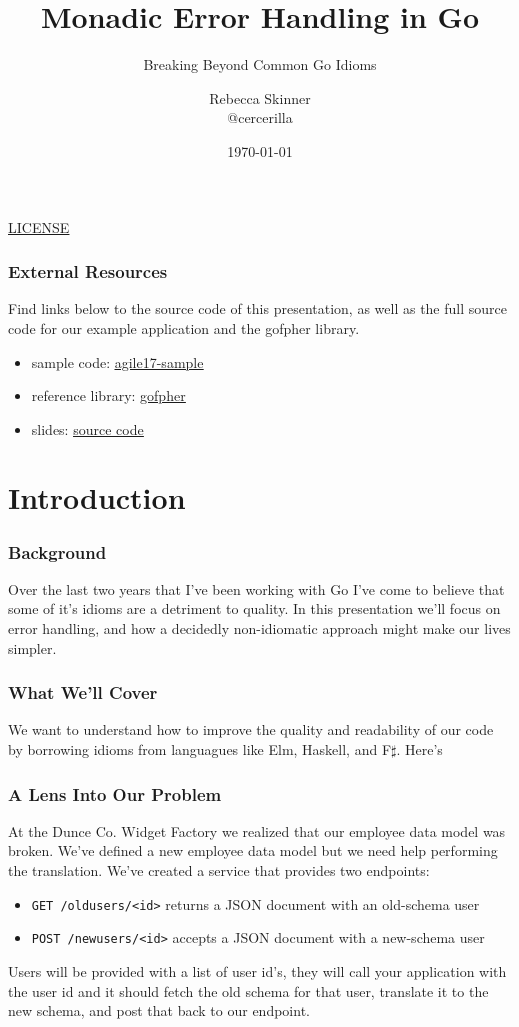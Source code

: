 \documentclass{beamer}
\title{Monadic Error Handling in Go}
\subtitle{Breaking Beyond Common Go Idioms}
\author{Rebecca Skinner\\ \small{@cercerilla}}
\institute{Asteris, LLC}
\date{\today}
\newcommand{\chref}[3] {
  {\color{#1} \href{#2}{\underline{#3}}}
}
\begin{document}
\begin{frame}
  \titlepage{}
  \begin{center}
    \small{\chref{blue}{http://creativecommons.org/licenses/by-sa/4.0/}{LICENSE}}
  \end{center}
\end{frame}

\begin{frame}
  \frametitle{External Resources}
  Find links below to the source code of this presentation, as well as
  the full source code for our example application and the gofpher
  library.
  \\\vfill
  \begin{itemize}
  \item sample code: \chref{blue}{https://github.com/rebeccaskinner/agile17-sample}{agile17-sample}
  \item reference library: \chref{blue}{https://github.com/rebeccaskinner/gofpher}{gofpher}
  \item slides: \chref{blue}{https://github.com/rebeccaskinner/presentations/tree/agile-tech-2017/agile_tech_conference_2017}{source code}
  \end{itemize}
\end{frame}

\section{Introduction}
\begin{frame}
  \frametitle{Background}
  Over the last two years that I've been working with Go I've come to
  believe that some of it's idioms are a detriment to quality. In this
  presentation we'll focus on error handling, and how a decidedly
  non-idiomatic approach might make our lives simpler.
\end{frame}

\begin{frame}
  \frametitle{What We'll Cover}
  We want to understand how to improve the quality and readability of
  our code by borrowing idioms from languagues like Elm, Haskell, and
  F$\sharp$.  Here's
\end{frame}

\begin{frame}[fragile]
  \frametitle{A Lens Into Our Problem}
  At the Dunce Co. Widget Factory we realized that our employee data
  model was broken.  We've defined a new employee data model but we
  need help performing the translation. We've created a service that
  provides two endpoints:\\
  \vfill
  \begin{itemize}
  \item {\tt GET /oldusers/<id>} returns a JSON document with an old-schema user
  \item {\tt POST /newusers/<id>} accepts a JSON document with a new-schema user
  \end{itemize}
  \vfill
  Users will be provided with a list of user id's, they will call your
  application with the user id and it should fetch the old schema for
  that user, translate it to the new schema, and post that back to our
  endpoint.
\end{frame}
\end{document}
